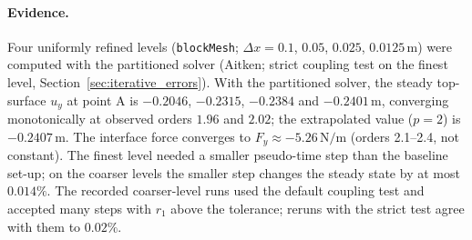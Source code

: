 \paragraph{Evidence.}
Four uniformly refined levels (\texttt{blockMesh}; $\Delta x = 0.1$, $0.05$, $0.025$, $0.0125\,\mathrm{m}$) were computed with the partitioned solver (Aitken; strict coupling test on the finest level, Section~\ref{sec:iterative_errors}).
With the partitioned solver, the steady top-surface $u_y$ at point A is $-0.2046$, $-0.2315$, $-0.2384$ and $-0.2401\,\mathrm{m}$, converging monotonically at observed orders $1.96$ and $2.02$; the extrapolated value ($p = 2$) is $-0.2407\,\mathrm{m}$. The interface force converges to $F_y \approx -5.26\,\mathrm{N/m}$ (orders 2.1--2.4, not constant).
The finest level needed a smaller pseudo-time step than the baseline set-up; on the coarser levels the smaller step changes the steady state by at most $0.014\%$. The recorded coarser-level runs used the default coupling test and accepted many steps with $r_1$ above the tolerance; reruns with the strict test agree with them to $0.02\%$.

